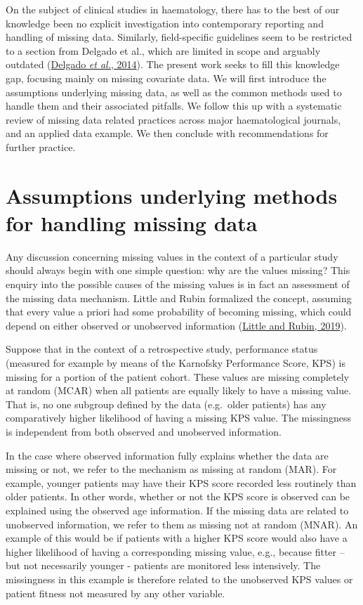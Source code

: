 \documentclass[
  letterpaper,
  DIV=11,
  numbers=noendperiod]{scrreprt}
\begin{document}
On the subject of clinical studies in haematology, there has to the best
of our knowledge been no explicit investigation into contemporary
reporting and handling of missing data. Similarly, field-specific
guidelines seem to be restricted to a section from Delgado et al., which
are limited in scope and arguably outdated
(\protect\hyperlink{ref-delgadoSurvivalAnalysisHematologic2014}{Delgado
\emph{et al.}, 2014}). The present work seeks to fill this knowledge
gap, focusing mainly on missing covariate data. We will first introduce
the assumptions underlying missing data, as well as the common methods
used to handle them and their associated pitfalls. We follow this up
with a systematic review of missing data related practices across major
haematological journals, and an applied data example. We then conclude
with recommendations for further practice.

\hypertarget{assumptions-underlying-methods-for-handling-missing-data}{%
\section{Assumptions underlying methods for handling missing
data}\label{assumptions-underlying-methods-for-handling-missing-data}}

Any discussion concerning missing values in the context of a particular
study should always begin with one simple question: why are the values
missing? This enquiry into the possible causes of the missing values is
in fact an assessment of the missing data mechanism. Little and Rubin
formalized the concept, assuming that every value a priori had some
probability of becoming missing, which could depend on either observed
or unobserved information
(\protect\hyperlink{ref-littleStatisticalAnalysisMissing2019}{Little and
Rubin, 2019}).

Suppose that in the context of a retrospective study, performance status
(measured for example by means of the Karnofsky Performance Score, KPS)
is missing for a portion of the patient cohort. These values are missing
completely at random (MCAR) when all patients are equally likely to have
a missing value. That is, no one subgroup defined by the data
(e.g.~older patients) has any comparatively higher likelihood of having
a missing KPS value. The missingness is independent from both observed
and unobserved information.

In the case where observed information fully explains whether the data
are missing or not, we refer to the mechanism as missing at random
(MAR). For example, younger patients may have their KPS score recorded
less routinely than older patients. In other words, whether or not the
KPS score is observed can be explained using the observed age
information. If the missing data are related to unobserved information,
we refer to them as missing not at random (MNAR). An example of this
would be if patients with a higher KPS score would also have a higher
likelihood of having a corresponding missing value, e.g., because fitter
-- but not necessarily younger - patients are monitored less
intensively. The missingness in this example is therefore related to the
unobserved KPS values or patient fitness not measured by any other
variable.
\end{document}
